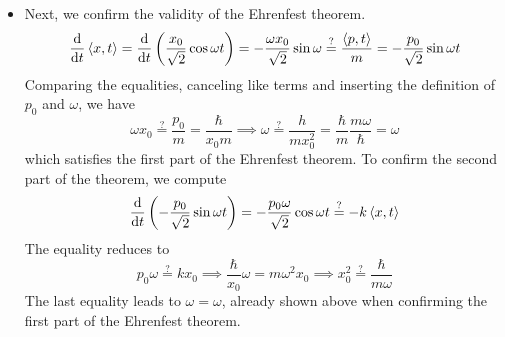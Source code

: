 \documentclass[11pt, a4paper]{article}
\begin{document}
\begin{itemize}
	\item Next, we confirm the validity of the Ehrenfest theorem.
	\begin{equation*}
		\dv{t}\ev{x, t} = \dv{t}\left( \frac{x_{0}}{\sqrt{2}}\cos \omega t\right) = - 		\frac{\omega x_{0}}{\sqrt{2}}\sin \omega \stackrel{?}{=} \frac{\ev{p, t}}{m} = - \frac{p_{0}}{\sqrt{2}}\sin \omega t
	\end{equation*}
	Comparing the equalities, canceling like terms and inserting the definition of $ p_{0} $ and $ \omega $, we have 
	\begin{equation*}
		 \omega x_{0} \stackrel{?}{=}\frac{p_{0}}{m} = \frac{\hbar}{x_{0}m} \implies \omega \stackrel{?}{=} \frac{h}{mx_{0}^{2}} = \frac{\hbar}{m}\frac{m \omega}{\hbar} = \omega
	\end{equation*}
	which satisfies the first part of the Ehrenfest theorem. To confirm the second part of the theorem, we compute
	\begin{equation*}
		\dv{t}\left(-\frac{p_{0}}{\sqrt{2}}\sin \omega t\right) = -\frac{p_{0}\omega}{\sqrt{2}}\cos \omega t\stackrel{?}{=} - k \ev{x, t}
	\end{equation*}
	The equality reduces to
	\begin{equation*}
		p_{0}\omega \stackrel{?}{=} kx_{0} \implies \frac{\hbar}{x_{0}}\omega = m \omega^{2}x_{0} \implies x_{0}^{2} \stackrel{?}{=} \frac{\hbar}{m \omega}
	\end{equation*}
	The last equality leads to $ \omega = \omega $, already shown above when confirming the first part of the Ehrenfest theorem.
	

\end{itemize}
\end{document}
